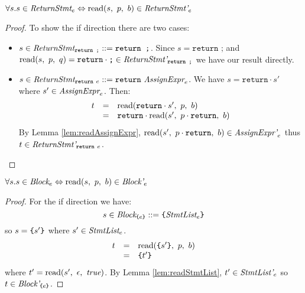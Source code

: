 \documentclass[preprint,10pt]{sigplanconf}
\begin{document}
\begin{lemma}\mbox{}
  
  \( \forall s. s \in \textit{ReturnStmt}_{e} \Leftrightarrow 
  \textrm{read}(s,~p,~b) \in \textit{ReturnStmt'}_{e} \)
\end{lemma}
\begin{proof}
  To show the if direction there are two cases:
  \begin{itemize}
  \item \( s \in \textit{ReturnStmt}_{\texttt{return ;}} ::=
    \texttt{return ;} \). Since \( s = \texttt{return ;} \) and \(
    \textrm{read}(s,~p,~q) = \texttt{return}\cdot\texttt{;} \in
    \textit{ReturnStmt'}_{\texttt{return ;}} \) we have our result
    directly.

  \item \( s \in \textit{ReturnStmt}_{\texttt{return}~e} ::=
    \texttt{return}~ \textit{AssignExpr}_{e} \). We have \( s
    = \texttt{return}\cdot s' \) where \( s' \in
    \textit{AssignExpr}_{e} \). Then:
    \[
    \begin{array}{rcl}
      t &=& \textrm{read}(\texttt{return} \cdot s',~p,~b)
      \\
      &=& \texttt{return}\cdot \textrm{read}(s',~p \cdot \texttt{return},~b)
    \end{array}
    \]
    By Lemma \ref{lem:readAssignExpr}, \( \textrm{read}(s',~p
      \cdot \texttt{return},~b) \in \textit{AssignExpr'}_{e}
    \) thus \( t \in \textit{ReturnStmt'}_{\texttt{return}~e} \).
  \end{itemize}
\end{proof}

\begin{lemma}\mbox{}
  
  \( \forall s. s \in \textit{Block}_{e} \Leftrightarrow 
  \textrm{read}(s,~p,~b) \in \textit{Block'}_{e} \)
\end{lemma}
\begin{proof}
  For the if direction we have:
  \[ 
  s \in \textit{Block}_{\texttt{\{}e\texttt{\}}} ::= \texttt{\{}\textit{StmtList}_{e}\texttt{\}}
  \]
  so \( s = \texttt{\{}s'\texttt{\}} \) where \( s' \in \textit{StmtList}_{e} \).
  \[
  \begin{array}{rcl}
    t &=& \textrm{read}(\texttt{\{}s'\texttt{\}},~p,~b)
    \\
    &=& \texttt{\{}t'\texttt{\}}
  \end{array}
  \]
  where \( t' = \textrm{read}(s',~\epsilon,~\textit{true}) \). By Lemma
  \ref{lem:readStmtList}, \( t' \in \textit{StmtList'}_{e} \)
  so \( t \in \textit{Block'}_{\texttt{\{}e\texttt{\}}} \).
\end{proof}
\end{document}
